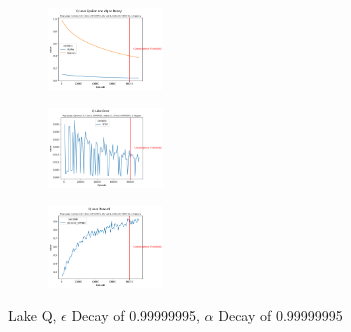 \documentclass[letterpaper]{article} %
\begin{document}
\begin{figure}[!htb]
	\centering
 	\begin{subfigure}[b]{0.175\textwidth}
		\includegraphics[width=1.2in]{Figures/Q_Lake_Epsilon_and_Alpha_Decay_Map_Large__Gamma_0_9__E_Dec_0_99999995__Alpha_0_1__A_Dec_0_99999995__Is_Slippery.png}
  	\end{subfigure}%
	 \begin{subfigure}[b]{0.175\textwidth}
		\includegraphics[width=1.2in]{Figures/Q_Lake_Error_Map_Large__Gamma_0_9__E_Dec_0_99999995__Alpha_0_1__A_Dec_0_99999995__Is_Slippery.png}
  	\end{subfigure}%
	\begin{subfigure}[b]{0.175\textwidth}
		\includegraphics[width=1.2in]{Figures/Q_Lake_Reward_Map_Large__Gamma_0_9__E_Dec_0_99999995__Alpha_0_1__A_Dec_0_99999995__Is_Slippery.png}
  	\end{subfigure}
\caption{Lake Q,  $\epsilon$ Decay of 0.99999995, $\alpha$ Decay of 0.99999995}
\label{fig:lake_q_e_99999995_a_99999995_rewards}
\end{figure}
\end{document}
